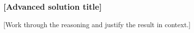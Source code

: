 \subsubsection*{[Advanced solution title]}
\label{sol:advanced-task}

[Work through the reasoning and justify the result in context.]




